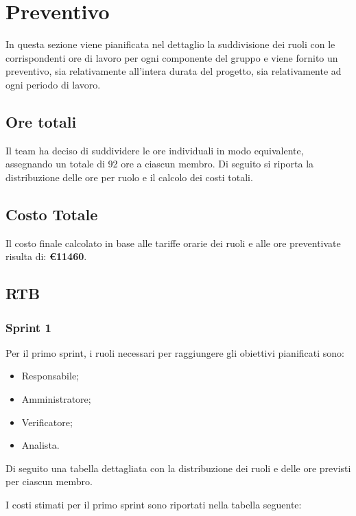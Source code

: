 \section{Preventivo}
In questa sezione viene pianificata nel dettaglio la suddivisione dei ruoli con
le corrispondenti ore di lavoro per ogni componente del gruppo e viene fornito
un preventivo, sia relativamente all'intera durata del progetto, sia
relativamente ad ogni periodo di lavoro.

\subsection{Ore totali}
Il team ha deciso di suddividere le ore individuali in modo equivalente,
assegnando un totale di 92 ore a ciascun membro. Di seguito si riporta la
distribuzione delle ore per ruolo e il calcolo dei costi totali.




\subsection{Costo Totale}
Il costo finale calcolato in base alle tariffe orarie dei ruoli e alle ore
preventivate risulta di: \textbf{\euro 11460}.
\pagebreak
\subsection{RTB}
\subsubsection{Sprint 1}
Per il primo sprint, i ruoli necessari per raggiungere gli obiettivi
pianificati sono:
\begin{itemize}
    \item Responsabile;
    \item Amministratore;
    \item Verificatore;
    \item Analista.
\end{itemize}

Di seguito una tabella dettagliata con la distribuzione dei ruoli e delle ore previsti per ciascun membro.




I costi stimati per il primo sprint sono riportati nella tabella seguente:




